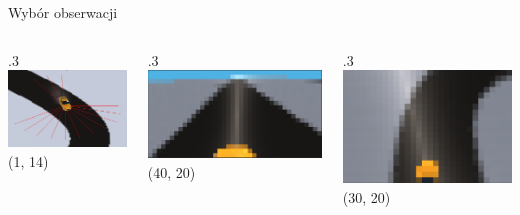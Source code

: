 \begin{frame}{Wybór obserwacji}
	\begin{columns}
		\begin{column}{.3\hsize}
			\centering
			\includegraphics[width=\linewidth]{figures/observations_1.png}
			(1, 14)
		\end{column}
		\begin{column}{.3\hsize}
			\centering
			\includegraphics[width=\linewidth]{figures/observations_2.png}
			(40, 20)
		\end{column}
		\begin{column}{.3\hsize}
			\centering
			\includegraphics[width=\linewidth]{figures/observations_3.png}
			(30, 20)
		\end{column}
	\end{columns}
	
\end{frame}
